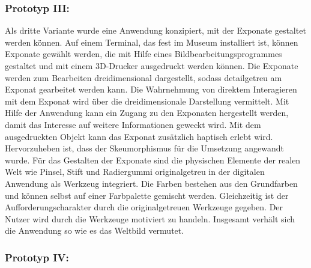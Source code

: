 \documentclass[runningheads,a4paper, 12pt]{llncs}
\begin{document}
\subsubsection{Prototyp III:} \label{chapt:paperprotoIII}
Als dritte Variante wurde eine Anwendung konzipiert, mit der Exponate gestaltet werden können. Auf einem Terminal, das fest im Museum installiert ist, können Exponate gewählt werden, die mit Hilfe eines Bildbearbeitungsprogrammes gestaltet und mit einem 3D-Drucker ausgedruckt werden können. Die Exponate werden zum Bearbeiten dreidimensional dargestellt, sodass detailgetreu am Exponat gearbeitet werden kann. Die Wahrnehmung von direktem Interagieren mit dem Exponat wird über die dreidimensionale Darstellung vermittelt. Mit Hilfe der Anwendung kann ein Zugang zu den Exponaten hergestellt werden, damit das Interesse auf weitere Informationen geweckt wird. Mit dem ausgedruckten Objekt kann das Exponat zusätzlich haptisch erlebt wird. Hervorzuheben ist, dass der Skeumorphismus für die Umsetzung angewandt wurde. Für das Gestalten der Exponate sind die physischen Elemente der realen Welt wie Pinsel, Stift und Radiergummi originalgetreu in der digitalen Anwendung als Werkzeug integriert. Die Farben bestehen aus den Grundfarben und können selbst auf einer Farbpalette gemischt werden. Gleichzeitig ist der Aufforderungscharakter durch die originalgetreuen Werkzeuge gegeben. Der Nutzer wird durch die Werkzeuge motiviert zu handeln.
Insgesamt verhält sich die Anwendung so wie es das Weltbild vermutet.\\







\subsubsection{Prototyp IV:} \label{chapt:paperprotoIV}
\end{document}
